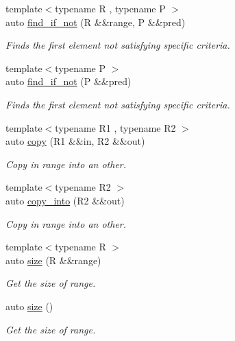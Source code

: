 \begin{DoxyCompactItemize}
{\footnotesize template$<$typename R , typename P $>$ }\\auto \mbox{\hyperlink{namespacerah_af758ef3c67d20ba6260319cb0e0171c5}{find\+\_\+if\+\_\+not}} (R \&\&range, P \&\&pred)
\begin{DoxyCompactList}\small\item\em Finds the first element not satisfying specific criteria. \end{DoxyCompactList}\item 
{\footnotesize template$<$typename P $>$ }\\auto \mbox{\hyperlink{namespacerah_a406c37a2cf758e7329bfd696a6bf8f89}{find\+\_\+if\+\_\+not}} (P \&\&pred)
\begin{DoxyCompactList}\small\item\em Finds the first element not satisfying specific criteria. \end{DoxyCompactList}\item 
{\footnotesize template$<$typename R1 , typename R2 $>$ }\\auto \mbox{\hyperlink{namespacerah_a1d0f36ff683cedc9090956ea389b3312}{copy}} (R1 \&\&in, R2 \&\&out)
\begin{DoxyCompactList}\small\item\em Copy in range into an other. \end{DoxyCompactList}\item 
{\footnotesize template$<$typename R2 $>$ }\\auto \mbox{\hyperlink{namespacerah_ad9c29fa208b4ab8bfb9c226a1f82b9a1}{copy\+\_\+into}} (R2 \&\&out)
\begin{DoxyCompactList}\small\item\em Copy in range into an other. \end{DoxyCompactList}\item 
{\footnotesize template$<$typename R $>$ }\\auto \mbox{\hyperlink{namespacerah_a85af749badb4261aa3c97a1d98134493}{size}} (R \&\&range)
\begin{DoxyCompactList}\small\item\em Get the size of range. \end{DoxyCompactList}\item 
auto \mbox{\hyperlink{namespacerah_aaee48fa7a804b4fd19c6a78bdd8d4c85}{size}} ()
\begin{DoxyCompactList}\small\item\em Get the size of range. \end{DoxyCompactList}\item 

\end{DoxyCompactItemize}
